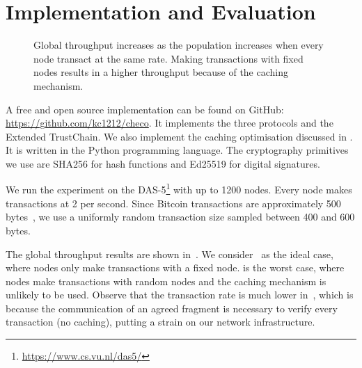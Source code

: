 \section{Implementation and Evaluation}
\label{sec:implementation}

\begin{figure*}[ht]
  \centering
  \caption{Global throughput increases as the population increases when every node transact at the same rate.
  Making transactions with fixed nodes results in a higher throughput because of the caching mechanism.}
  \label{fig:global-throughput}
\end{figure*}

A free and open source implementation can be found on GitHub: \url{https://github.com/kc1212/checo}.
It implements the three protocols and the Extended TrustChain.
We also implement the caching optimisation discussed in .
It is written in the Python programming language.
The cryptography primitives we use are SHA256 for hash functions and Ed25519 for digital signatures.

We run the experiment on the DAS-5\footnote{\url{https://www.cs.vu.nl/das5/}} with up to 1200 nodes.
Every node makes transactions at 2 per second.
Since Bitcoin transactions are approximately 500 bytes~\cite{txsize},
we use a uniformly random transaction size sampled between 400 and 600 bytes.

The global throughput results are shown in~.
We consider~ as the ideal case,
where nodes only make transactions with a fixed node.
 is the worst case,
where nodes make transactions with random nodes and the caching mechanism is unlikely to be used.
Observe that the transaction rate is much lower in~,
which is because the communication of an agreed fragment is necessary to verify every transaction (no caching),
putting a strain on our network infrastructure.

